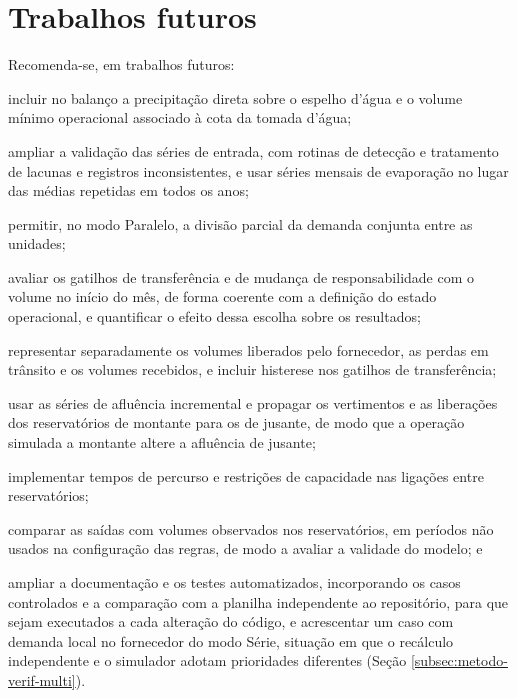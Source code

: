 \section{Trabalhos futuros}
\label{sec:trabalhos-futuros}

Recomenda-se, em trabalhos futuros:

\begin{alineas}
    \item incluir no balanço a precipitação direta sobre o espelho d'água e o volume mínimo operacional associado à cota da tomada d'água;
    \item ampliar a validação das séries de entrada, com rotinas de detecção e tratamento de lacunas e registros inconsistentes, e usar séries mensais de evaporação no lugar das médias repetidas em todos os anos;
    \item permitir, no modo Paralelo, a divisão parcial da demanda conjunta entre as unidades;
    \item avaliar os gatilhos de transferência e de mudança de responsabilidade com o volume no início do mês, de forma coerente com a definição do estado operacional, e quantificar o efeito dessa escolha sobre os resultados;
    \item representar separadamente os volumes liberados pelo fornecedor, as perdas em trânsito e os volumes recebidos, e incluir histerese nos gatilhos de transferência;
    \item usar as séries de afluência incremental e propagar os vertimentos e as liberações dos reservatórios de montante para os de jusante, de modo que a operação simulada a montante altere a afluência de jusante;
    \item implementar tempos de percurso e restrições de capacidade nas ligações entre reservatórios;
    \item comparar as saídas com volumes observados nos reservatórios, em períodos não usados na configuração das regras, de modo a avaliar a validade do modelo; e
    \item ampliar a documentação e os testes automatizados, incorporando os casos controlados e a comparação com a planilha independente ao repositório, para que sejam executados a cada alteração do código, e acrescentar um caso com demanda local no fornecedor do modo Série, situação em que o recálculo independente e o simulador adotam prioridades diferentes (Seção \ref{subsec:metodo-verif-multi}).
\end{alineas}
